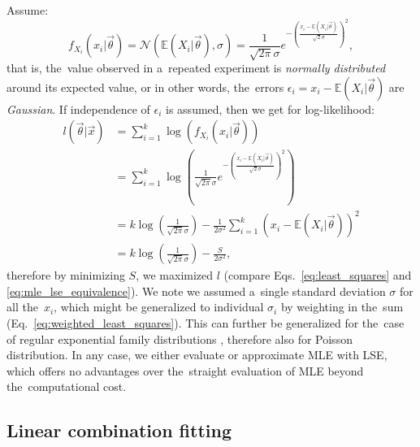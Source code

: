 Assume: 
\begin{equation}
    f_{X_i}(x_i|\vec{\theta}) = \mathcal{N}(\mathbb{E}(X_i|\vec{\theta}),\sigma) = \frac{1}{\sqrt{2 \pi} \sigma} e^{-\left( \frac{x_i - \mathbb{E}(X_i|\vec{\theta})}{\sqrt{2} \sigma} \right)^2},
\end{equation}
that is, the~value observed in a~repeated experiment is \textit{normally distributed} around its expected value, or in other words, the~errors $\epsilon_i = x_i - \mathbb{E}(X_i|\vec{\theta})$ are \textit{Gaussian}. If independence of $\epsilon_i$ is assumed, then we get for log-likelihood:
\begin{equation}\begin{split}
    l(\vec{\theta}|\vec{x}) 
    &= \sum_{i=1}^{k} \log \left( f_{X_i}(x_i|\vec{\theta}) \right)  \\
    &= \sum_{i=1}^{k} \log \left( \frac{1}{\sqrt{2 \pi} \sigma} e^{-\left( \frac{x_i - \mathbb{E}(X_i|\vec{\theta})}{\sqrt{2} \sigma} \right)^2} \right) \\
    &= k\log\left(\frac{1}{\sqrt{2 \pi} \sigma}\right) - \frac{1}{2 \sigma^2} \sum_{i=1}^{k} \left(  x_i - \mathbb{E}(X_i|\vec{\theta}) \right)^2 \\
    &= k\log\left(\frac{1}{\sqrt{2 \pi} \sigma}\right) - \frac{S}{2 \sigma^2}, \label{eq:mle_lse_equivalence}
\end{split}\end{equation}
therefore by minimizing $S$, we maximized $l$ (compare Eqs.~\ref{eq:least_squares} and \ref{eq:mle_lse_equivalence}). We note we assumed a~single standard deviation $\sigma$ for all the~$x_i$, which might be generalized to individual $\sigma_i$ by weighting in the~sum (Eq.~\ref{eq:weighted_least_squares}). This can further be generalized for the~case of regular exponential family distributions \citep{charnes1976equivalence}, therefore also for Poisson distribution. In any case, we either evaluate or approximate MLE with LSE, which offers no advantages over the~straight evaluation of MLE beyond the~computational cost.

\subsection{Linear combination fitting}

